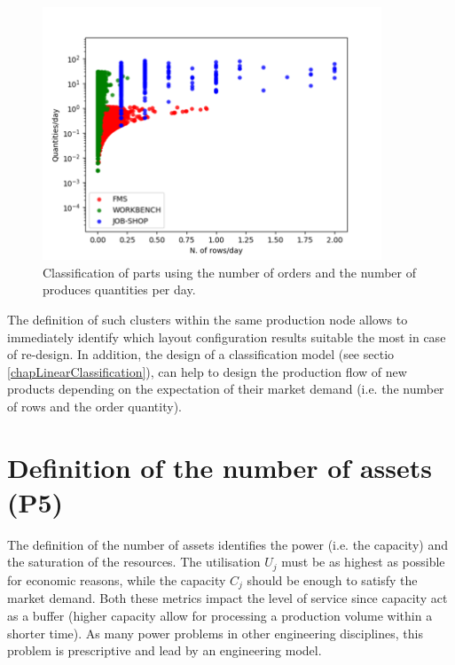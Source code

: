 \begin{figure}[hbt!]
\centering
\includegraphics[width=0.9\textwidth]{sectionProduction/design_plant_figures/fig_prod_flexauto3.png}
\captionsetup{type=figure}
\caption{Classification of parts using the number of orders and the number of produces quantities per day.}
\label{fig_prod_flexauto3}
\end{figure}

The definition of such clusters within the same production node allows to immediately identify which layout configuration results suitable the most in case of re-design. In addition, the design of a classification model (see sectio \ref{chapLinearClassification}), can help to design the production flow of new products depending on the expectation of their market demand (i.e. the number of rows and the order quantity).

\section{Definition of the number of assets (P5)}
The definition of the number of assets identifies the power (i.e. the capacity) and the saturation of the resources. The utilisation $U_j$ must be as highest as possible for economic reasons, while the capacity $C_j$ should be enough to satisfy the market demand. Both these metrics impact the level of service since capacity act as a buffer (higher capacity allow for processing a production volume within a shorter time). As many power problems in other engineering disciplines, this problem is prescriptive and lead by an engineering model.

